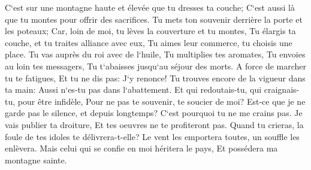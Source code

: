 \verse C`est sur une montagne haute et élevée que tu dresses ta couche; C`est aussi là que tu montes pour offrir des sacrifices. 
\verse Tu mets ton souvenir derrière la porte et les poteaux; Car, loin de moi, tu lèves la couverture et tu montes, Tu élargis ta couche, et tu traites alliance avec eux, Tu aimes leur commerce, tu choisis une place. 
\verse Tu vas auprès du roi avec de l`huile, Tu multiplies tes aromates, Tu envoies au loin tes messagers, Tu t`abaisses jusqu`au séjour des morts. 
\verse A force de marcher tu te fatigues, Et tu ne dis pas: J`y renonce! Tu trouves encore de la vigueur dans ta main: Aussi n`es-tu pas dans l`abattement. 
\verse Et qui redoutais-tu, qui craignais-tu, pour être infidèle, Pour ne pas te souvenir, te soucier de moi? Est-ce que je ne garde pas le silence, et depuis longtemps? C`est pourquoi tu ne me crains pas. 
\verse Je vais publier ta droiture, Et tes oeuvres ne te profiteront pas. 
\verse Quand tu crieras, la foule de tes idoles te délivrera-t-elle? Le vent les emportera toutes, un souffle les enlèvera. Mais celui qui se confie en moi héritera le pays, Et possédera ma montagne sainte. 
